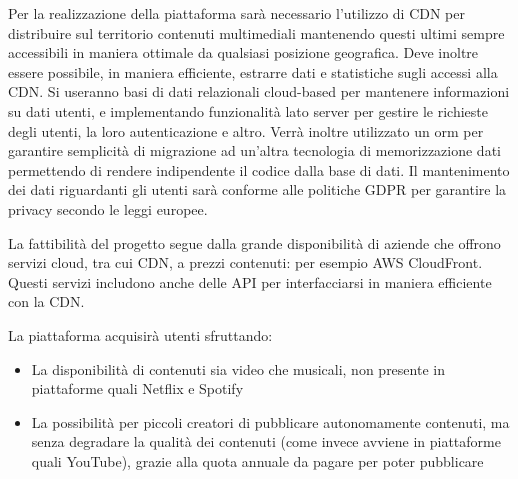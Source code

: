 \begin{flushleft}
    {Per la realizzazione della piattaforma sarà necessario l'utilizzo di CDN per distribuire sul territorio contenuti multimediali mantenendo questi ultimi sempre accessibili in maniera ottimale da qualsiasi posizione geografica. Deve inoltre essere possibile, in maniera efficiente, estrarre dati e statistiche sugli accessi alla CDN. Si useranno basi di dati relazionali cloud-based per mantenere informazioni su dati utenti, e implementando funzionalità lato server per gestire le richieste degli utenti, la loro autenticazione e altro. Verrà inoltre utilizzato un orm per garantire semplicità di migrazione ad un'altra tecnologia di memorizzazione dati permettendo di rendere indipendente il codice dalla base di dati.
Il mantenimento dei dati riguardanti gli utenti sarà conforme alle politiche GDPR per garantire la privacy secondo le leggi europee.}
\end{flushleft}

\begin{flushleft}
    {}
\end{flushleft}

\begin{flushleft}
    {La fattibilità del progetto segue dalla grande disponibilità di aziende che offrono servizi cloud, tra cui CDN, a prezzi contenuti: per esempio AWS CloudFront. Questi servizi includono anche delle API per interfacciarsi in maniera efficiente con la CDN.}
\end{flushleft}

\begin{flushleft}
    {La piattaforma acquisirà utenti sfruttando:}
    
    \begin{itemize}
        \item {La disponibilità di contenuti sia video che musicali, non presente in piattaforme quali Netflix e Spotify}
        
        \item {La possibilità per piccoli creatori di pubblicare autonomamente contenuti, ma senza degradare la qualità dei contenuti (come invece avviene in piattaforme quali YouTube), grazie alla quota annuale da pagare per poter pubblicare}
    \end{itemize}
\end{flushleft}